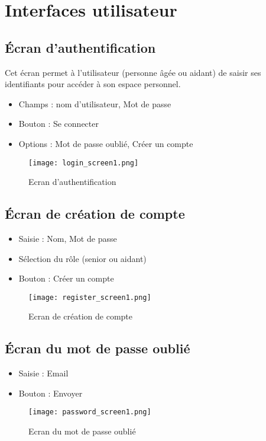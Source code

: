 \documentclass[12pt,a4paper]{report}
\begin{document}
\section{Interfaces utilisateur}

\subsection{Écran d’authentification}

Cet écran permet à l’utilisateur (personne âgée ou aidant) de saisir ses identifiants pour accéder à son espace personnel.

\begin{itemize}
    \item Champs : nom d'utilisateur, Mot de passe
    \item Bouton : Se connecter
    \item Options : Mot de passe oublié, Créer un compte
\end{itemize}
 
\begin{figure}[H] 
    \centering
    \texttt{[image: login\_screen1.png]}
    \caption{Ecran d'authentification }
    \label{fig:ecranAuthentification}
\end{figure}
\subsection{Écran de création de compte}

\begin{itemize}
    \item Saisie : Nom,  Mot de passe
    \item Sélection du rôle (senior ou aidant)
    \item Bouton : Créer un compte
\end{itemize}

\begin{figure}[H] 
    \centering
    \texttt{[image: register\_screen1.png]}
    \caption{Ecran de création de compte  }
    \label{fig:ecranCreation}
\end{figure}
\subsection{Écran du mot de passe oublié}
\begin{itemize}
    \item Saisie : Email
    \item Bouton : Envoyer
\end{itemize}
\begin{figure}[H] 
    \centering
    \texttt{[image: password\_screen1.png]}
    \caption{Ecran du mot de passe oublié }
    \label{fig:ecranPassword}
\end{figure}
\end{document}
